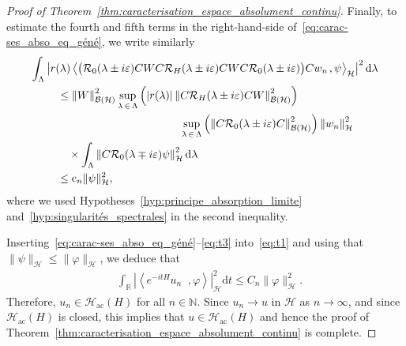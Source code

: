 \documentclass[10pt]{amsart}
\theoremstyle{definition}\newtheorem{defi}[theo]{Definition}\newtheorem{rema}[theo]{Remark}\newtheorem{exam}[theo]{Example}\newtheorem{exem}[theo]{Example}\newtheorem{nota}[theo]{Notation}
\newcommand{\Hi}{\mathcal{H}}
\newcommand{\R}{\mathbb{R}}
\newcommand{\N}{\mathbb{N}}
\newcommand{\acr}{\mathrm{ac}}
\newcommand{\rmc}{\mathrm{c}}
\newcommand{\rmd}{\mathrm{d}}
\newcommand{\norme}[1]{\left\Vert #1\right\Vert}
\newcommand{\scal}[2]{\left\langle{#1} \middle., {#2}\right\rangle}
\newcommand{\abso}[1]{\left|{#1}\right|}
\newcommand{\Res}{\mathcal{R}}
\newcommand{\clB}{\mathcal{B}}
\begin{document}
\begin{proof}[Proof of Theorem~\ref{thm:caracterisation_espace_absolument_continu}]
Finally, to estimate the fourth and fifth terms in the right-hand-side of~\eqref{eq:carac-ses_abso_eq_géné}, we write similarly
\begin{multline}\label{eq:t3}
\int_\Lambda\abso{r(\lambda)\scal{\big(\Res_0(\lambda\pm i\varepsilon)CWC\Res_H(\lambda\pm i\varepsilon)CWC\Res_0(\lambda\pm i\varepsilon)\big)Cw_n}{\psi}_\Hi}^2\rmd \lambda\\
\begin{aligned}
&\leq \norme{W}_{\clB(\Hi)}^2\sup_{\lambda\,\in\,\Lambda}\left(|r(\lambda)|\norme{C\Res_H(\lambda\pm i\varepsilon)CW}_{\clB(\Hi)}^2\right)
\\&\mkern200mu \sup_{\lambda\,\in\,\Lambda}\left(\norme{C\Res_0(\lambda\pm i\varepsilon)C}_{\clB(\Hi)}^2\right)\norme{w_n}^2_{\Hi} \\
&\quad\times\int_\Lambda\norme{C\Res_0(\lambda\mp i\varepsilon)\psi}_\Hi^2\rmd \lambda\\
&\leq \rmc_n\|\psi\|^2_\Hi,
\end{aligned}
\end{multline}
where we used Hypotheses~\ref{hyp:principe_absorption_limite} and~\ref{hyp:singularités_spectrales} in the second inequality.

Inserting~\eqref{eq:carac-ses_abso_eq_géné}--\eqref{eq:t3} into~\eqref{eq:t1} and using that $\|\psi\|_\Hi\le\|\varphi\|_\Hi$, we deduce that
\begin{align*}
&\int_\R\abso{\scal{e^{-itH}u_n}{\varphi}}_\Hi^2\rmd t \le C_n\|\varphi\|^2_\Hi.
\end{align*}
Therefore, $u_n\in\Hi_{\acr}(H)$ for all $n\in\N$. Since $u_n\to u$ in $\Hi$ as $n\to\infty$, and since $\Hi_{\acr}(H)$ is closed, this implies that $u\in\Hi_{\acr}(H)$ and hence the proof of Theorem~\ref{thm:caracterisation_espace_absolument_continu}  is complete.
\end{proof}
\end{document}
